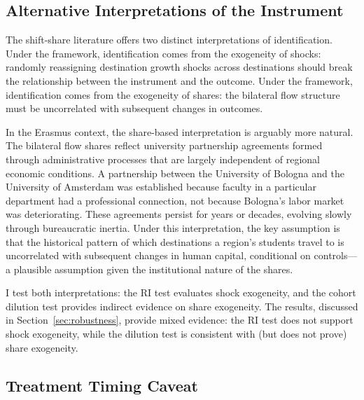 \documentclass[12pt]{article}
\begin{document}
\subsection{Alternative Interpretations of the Instrument}

The shift-share literature offers two distinct interpretations of identification. Under the \citet{borusyak_hull_jaravel_2022} framework, identification comes from the exogeneity of shocks: randomly reassigning destination growth shocks across destinations should break the relationship between the instrument and the outcome. Under the \citet{goldsmith_pinkham_sorkin_swift_2020} framework, identification comes from the exogeneity of shares: the bilateral flow structure must be uncorrelated with subsequent changes in outcomes.

In the Erasmus context, the share-based interpretation is arguably more natural. The bilateral flow shares reflect university partnership agreements formed through administrative processes that are largely independent of regional economic conditions. A partnership between the University of Bologna and the University of Amsterdam was established because faculty in a particular department had a professional connection, not because Bologna's labor market was deteriorating. These agreements persist for years or decades, evolving slowly through bureaucratic inertia. Under this interpretation, the key assumption is that the historical pattern of which destinations a region's students travel to is uncorrelated with subsequent changes in human capital, conditional on controls---a plausible assumption given the institutional nature of the shares.

I test both interpretations: the RI test evaluates shock exogeneity, and the cohort dilution test provides indirect evidence on share exogeneity. The results, discussed in Section~\ref{sec:robustness}, provide mixed evidence: the RI test does not support shock exogeneity, while the dilution test is consistent with (but does not prove) share exogeneity.

\subsection{Treatment Timing Caveat}
\end{document}
